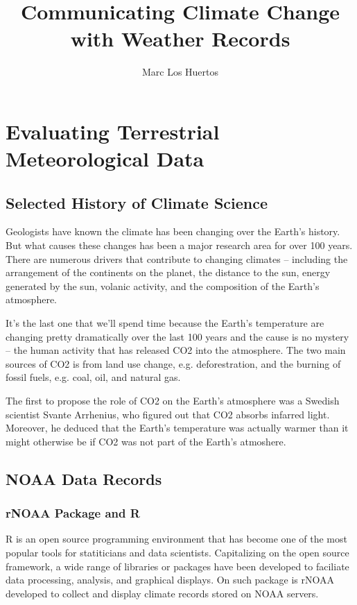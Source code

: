 \documentclass{article}
\title{Communicating Climate Change with Weather Records}
\author{Marc Los Huertos}
\begin{document}
\maketitle

\section{Evaluating Terrestrial Meteorological Data}

\subsection{Selected History of Climate Science}

Geologists have known the climate has been changing over the Earth's history. But what causes these changes has been a major research area for over 100 years. There are numerous drivers that contribute to changing climates -- including the arrangement of the continents on the planet, the distance to the sun, energy generated by the sun, volanic activity, and the composition of the Earth's atmosphere. 

It's the last one that we'll spend time because the Earth's temperature are changing pretty dramatically over the last 100 years and the cause is no mystery -- the human activity that has released CO2 into the atmosphere. The two main sources of CO2 is from land use change, e.g. deforestration, and the burning of fossil fuels, e.g. coal, oil, and natural gas. 

The first to propose the role of CO2 on the Earth's atmosphere was a Swedish scientist Svante Arrhenius, who figured out that CO2 absorbs infarred light. Moreover, he deduced that the Earth's temperature was actually warmer than it might otherwise be if CO2 was not part of the Earth's atmoshere. 


\subsection{NOAA Data Records}


\subsubsection{rNOAA Package and R}

R is an open source programming environment that has become one of the most popular tools for statiticians and data scientists. Capitalizing on the open source framework, a wide range of libraries or packages have been developed to faciliate data processing, analysis, and graphical displays. On such package is rNOAA developed to collect and display climate records stored on NOAA servers.
\end{document}
